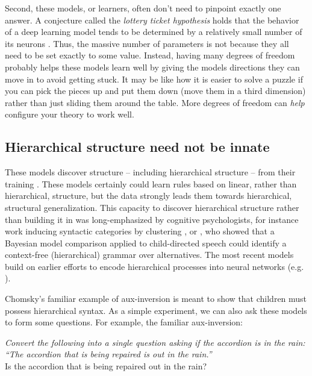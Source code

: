 \documentclass[output=paper,colorlinks,citecolor=brown]{langscibook}
\begin{document}
Second, these models, or learners, often don't need to pinpoint exactly one answer. A conjecture called the \textit{lottery ticket hypothesis} holds that the behavior of a deep learning model tends to be determined by a relatively small number of its neurons \citep{frankle2018lottery}. Thus, the massive number of parameters is not because they all need to be set exactly to some value. Instead, having many degrees of freedom probably helps these models learn well by giving the models directions they can move in to avoid getting stuck. It may be like how it is easier to solve a puzzle if you can pick the pieces up and put them down (move them in a third dimension) rather than just sliding them around the table. More degrees of freedom can \textit{help} configure your theory to work well. 

\subsection{Hierarchical structure need not be innate}

These models discover structure -- including hierarchical structure -- from their training \citep{hewitt2019structural,manning2020emergent,lin2019open,tenney2019you,warstadt2020can,kim2020pre,linzen2021syntactic,mahowald2023dissociating}. These models certainly could learn rules based on linear, rather than hierarchical, structure, but the data strongly leads them towards hierarchical, structural generalization. This capacity to discover hierarchical structure rather than building it in was long-emphasized by cognitive psychologists, for instance work inducing syntactic categories by clustering \citep{redington1998distributional,clark2000inducing}, or \citet{perfors2011learnability}, who showed that a Bayesian model comparison applied to child-directed speech could identify a context-free (hierarchical) grammar over alternatives.  The most recent models build on earlier efforts to encode hierarchical processes into neural networks (e.g. \citealt{tabor1997parsing,christiansen1999toward,tabor2000fractal,smolensky2006harmonic}).  

Chomsky's familiar example of aux-inversion is meant to show that children must possess hierarchical syntax. As a simple experiment, we can also ask these models to form some questions. For example, the familiar aux-inversion:

\begin{myquote}
\textit{Convert the following into a single question asking if the accordion is in the rain: ``The accordion that is being repaired is out in the rain.''}\medskip\\
\noindent Is the accordion that is being repaired out in the rain?
\end{myquote}
\end{document}

